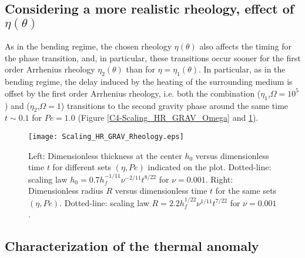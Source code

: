 \subsection{Considering   a  more   realistic   rheology,  effect   of
  $\eta(\theta)$}
\label{C4-sec:cons-more-real-1}
 
As  in the  bending regime,  the chosen  rheology $\eta(\theta)$  also
affects the timing for the phase transition, and, in particular, these
transitions  occur  sooner  for  the first  order  Arrhenius  rheology
$\eta_2(\theta)$ than for $\eta=\eta_1(\theta)$.  In particular, as in
the  bending  regime,  the  delay   induced  by  the  heating  of  the
surrounding medium  is offset by  the first order  Arrhenius rheology,
i.e.     both    the    combination    ($\eta_1$,$\Omega=10^5$)    and
($\eta_2$,$\Omega=1$) transitions  to the second gravity  phase around
the    same     time    $t\sim     0.1$    for     $Pe=1.0$    (Figure
\ref{C4-Scaling_HR_GRAV_Omega} and \ref{C4-HR_GRAV_Rheology}).

\begin{figure}[h!]
  \begin{center}
    \graphicspath{ {/Users/thorey/Documents/These/Projet/Refroidissement/Skin_Model/Figure/Figure_Heating/} }
    \texttt{[image: Scaling\_HR\_GRAV\_Rheology.eps]}
    \caption{Left: Dimensionless thickness at  the center $h_0$ versus
      dimensionless time $t$ for  different sets $(\eta,Pe)$ indicated
      on      the      plot.        Dotted-line:      scaling      law
      $h_0=   0.7h_f^{-1/11}\nu^{-2/11}t^{8/22}$    for   $\nu=0.001$.
      Right: Dimensionless  radius $R$  versus dimensionless  time $t$
      for  the  same  sets   $(\eta,Pe)$.   Dotted-line:  scaling  law
      $R= 2.2h_f^{1/22}\nu^{1/11}t^{7/22}$ for $\nu =0.001$.}
    \label{C4-HR_GRAV_Rheology}
  \end{center}
\end{figure}

\subsection{Characterization of the thermal anomaly}
\label{C4-sec:char-therm-anom-2}

